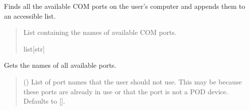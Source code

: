 \documentclass[letterpaper,10pt,english]{sphinxmanual}
\begin{document}
\begin{fulllineitems}

\begin{fulllineitems}
\label{\detokenize{Morelia.Devices.SerialPorts:Morelia.Devices.SerialPorts.PortAccess.FindPorts.GetAllPortNames}}
\pysigstartsignatures
{}
\pysigstopsignatures
\sphinxAtStartPar
Finds all the available COM ports on the user’s computer and appends them to an         accessible list.
\begin{quote}\begin{description}
\sphinxAtStartPar
List containing the names of available COM ports.

\sphinxAtStartPar
list{[}str{]}

\end{description}\end{quote}

\end{fulllineitems}


\begin{fulllineitems}
\label{\detokenize{Morelia.Devices.SerialPorts:Morelia.Devices.SerialPorts.PortAccess.FindPorts.GetSelectPortNames}}
\pysigstartsignatures
{}
\pysigstopsignatures
\sphinxAtStartPar
Gets the names of all available ports.
\begin{quote}\begin{description}
\sphinxAtStartPar
{} (\sphinxstyleliteralemphasis{\sphinxupquote{{[}}}\sphinxstyleliteralemphasis{\sphinxupquote{{]}}}\sphinxstyleliteralemphasis{\sphinxupquote{, }}) \textendash{} List of port names that the user should                 not use. This may be because these ports are already in use or that                 the port is not a POD device. Defaults to {[}{]}.


\end{description}
\end{quote}
\end{fulllineitems}
\end{fulllineitems}
\end{document}

